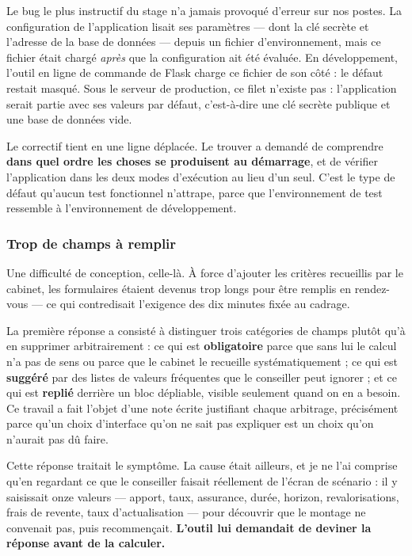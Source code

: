 \documentclass[12pt,a4paper]{article}
\begin{document}
Le bug le plus instructif du stage n'a jamais provoqué d'erreur sur nos postes.
La configuration de l'application lisait ses paramètres --- dont la clé secrète
et l'adresse de la base de données --- depuis un fichier d'environnement, mais
ce fichier était chargé \emph{après} que la configuration ait été évaluée. En
développement, l'outil en ligne de commande de Flask charge ce fichier de son
côté : le défaut restait masqué. Sous le serveur de production, ce filet n'existe
pas : l'application serait partie avec ses valeurs par défaut, c'est-à-dire une
clé secrète publique et une base de données vide.

Le correctif tient en une ligne déplacée. Le trouver a demandé de comprendre
\textbf{dans quel ordre les choses se produisent au démarrage}, et de vérifier
l'application dans les deux modes d'exécution au lieu d'un seul. C'est le type de
défaut qu'aucun test fonctionnel n'attrape, parce que l'environnement de test
ressemble à l'environnement de développement.

\subsubsection{Trop de champs à remplir}
\label{sec:saisie}

Une difficulté de conception, celle-là. À force d'ajouter les critères
recueillis par le cabinet, les formulaires étaient devenus trop longs pour être
remplis en rendez-vous --- ce qui contredisait l'exigence des dix minutes fixée
au cadrage.

La première réponse a consisté à distinguer trois catégories de champs plutôt
qu'à en supprimer arbitrairement : ce qui est \textbf{obligatoire} parce que sans
lui le calcul n'a pas de sens ou parce que le cabinet le recueille
systématiquement ; ce qui est \textbf{suggéré} par des listes de valeurs
fréquentes que le conseiller peut ignorer ; et ce qui est \textbf{replié}
derrière un bloc dépliable, visible seulement quand on en a besoin. Ce travail a
fait l'objet d'une note écrite justifiant chaque arbitrage, précisément parce
qu'un choix d'interface qu'on ne sait pas expliquer est un choix qu'on n'aurait
pas dû faire.

Cette réponse traitait le symptôme. La cause était ailleurs, et je ne l'ai
comprise qu'en regardant ce que le conseiller faisait réellement de l'écran de
scénario : il y saisissait onze valeurs --- apport, taux, assurance, durée,
horizon, revalorisations, frais de revente, taux d'actualisation --- pour
découvrir que le montage ne convenait pas, puis recommençait. \textbf{L'outil
lui demandait de deviner la réponse avant de la calculer.}
\end{document}
